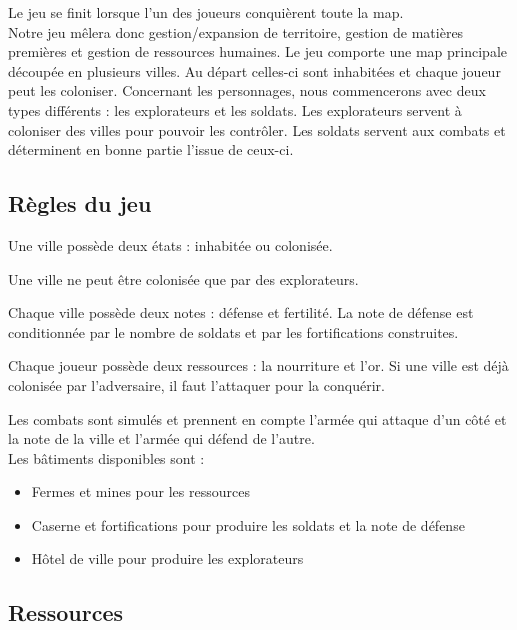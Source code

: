 \documentclass[a4paper,12pt]{article}
\begin{document}
Le jeu se finit lorsque l'un des joueurs conquièrent toute la map.
\\

Notre jeu mêlera donc gestion/expansion de territoire, gestion de matières premières et gestion de ressources humaines.
Le jeu comporte une map principale découpée en plusieurs villes. Au départ celles-ci sont inhabitées et chaque joueur peut les coloniser. Concernant les personnages, nous commencerons avec deux types différents : les explorateurs et les soldats. Les explorateurs servent à coloniser des villes pour pouvoir les contrôler. Les soldats servent aux combats et déterminent en bonne partie l'issue de ceux-ci.


\subsection{Règles du jeu}

\vspace{1\baselineskip}


Une ville possède deux états : inhabitée ou colonisée. 

Une ville ne peut être colonisée que par des explorateurs.

Chaque ville possède deux notes : défense et fertilité. La note de défense est conditionnée par le nombre de soldats et par les fortifications construites. 

Chaque joueur possède deux ressources : la nourriture et l'or.
Si une ville est déjà colonisée par l'adversaire, il faut l'attaquer pour la conquérir.

Les combats sont simulés et prennent en compte l'armée qui attaque d'un côté et la note de la ville et l'armée qui défend de l'autre.
\\

Les bâtiments disponibles sont : \begin{itemize}

\item Fermes et mines pour les ressources

\item Caserne et fortifications pour produire les soldats et la note de défense

\item Hôtel de ville pour produire les explorateurs

\end{itemize}


\subsection{Ressources}
\end{document}
